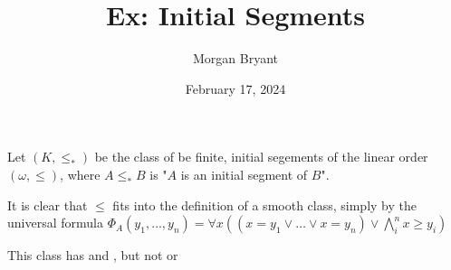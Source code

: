 \documentclass[a4paper]{article}
\title{Ex: Initial Segments}
\date{February 17, 2024}
\author{Morgan Bryant}
\begin{document}
\maketitle
\par{ Let \((K, \leq _*)\) be the class of be finite, initial segements of the linear order \(( \omega , \leq )\), where \(A \leq _* B\) is "\(A\) is an initial segment of \(B\)".}\par{It is clear that \(\leq\) fits into the definition of a smooth class, simply by the universal formula \(\Phi _A(y_1, \dots , y_n) =  \forall  x(( x=y_1 \lor \dots \lor  x=y_n)  \lor   \bigwedge _i^n x \geq  y_i)\)}\par{This class has  and , but not  or }
\printbibliography
\end{document}
